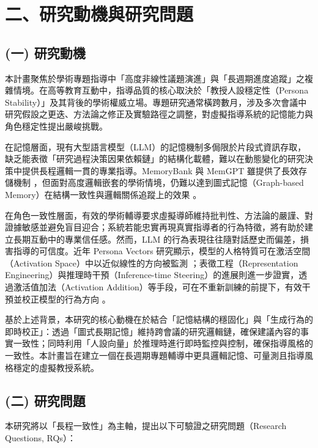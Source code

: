 
\section*{二、研究動機與研究問題}

\subsection*{(一) 研究動機}
本計畫聚焦於學術專題指導中「高度非線性議題演進」與「長週期進度追蹤」之複雜情境。在高等教育互動中，指導品質的核心取決於「教授人設穩定性（Persona Stability）」及其背後的學術權威立場。專題研究通常橫跨數月，涉及多次會議中研究假設之更迭、方法論之修正及實驗路徑之調整，對虛擬指導系統的記憶能力與角色穩定性提出嚴峻挑戰。

在記憶層面，現有大型語言模型（LLM）的記憶機制多侷限於片段式資訊存取，缺乏能表徵「研究過程決策因果依賴鏈」的結構化載體，難以在動態變化的研究決策中提供長程邏輯一貫的專業指導。MemoryBank 與 MemGPT 雖提供了長效存儲機制 \citep{a2305_10250v3_memorybank, a2310_08560v2_memgpt}，但面對高度邏輯嵌套的學術情境，仍難以達到圖式記憶（Graph-based Memory）在結構一致性與邏輯關係追蹤上的效果 \citep{a2602_05665v1_graphagentmemory}。

在角色一致性層面，有效的學術輔導要求虛擬導師維持批判性、方法論的嚴謹、對證據敏感並避免盲目迎合；系統若能忠實再現真實指導者的行為特徵，將有助於建立長期互動中的專業信任感。然而，LLM 的行為表現往往隨對話歷史而偏差，損害指導的可信度。近年 Persona Vectors 研究顯示，模型的人格特質可在激活空間（Activation Space）中以近似線性的方向被監測 \citep{a2507_21509v3_personavectors}；表徵工程（Representation Engineering）與推理時干預（Inference-time Steering）的進展則進一步證實，透過激活值加法（Activation Addition）等手段，可在不重新訓練的前提下，有效干預並校正模型的行為方向 \citep{turner-etal-2023-activation-addition, wehner-etal-2025-representation-engineering}。

基於上述背景，本研究的核心動機在於結合「記憶結構的穩固化」與「生成行為的即時校正」：透過「圖式長期記憶」維持跨會議的研究邏輯鏈，確保建議內容的事實一致性；同時利用「人設向量」於推理時進行即時監控與控制，確保指導風格的一致性。本計畫旨在建立一個在長週期專題輔導中更具邏輯記憶、可量測且指導風格穩定的虛擬教授系統。

\subsection*{(二) 研究問題}
本研究將以「長程一致性」為主軸，提出以下可驗證之研究問題（Research Questions, RQs）：

